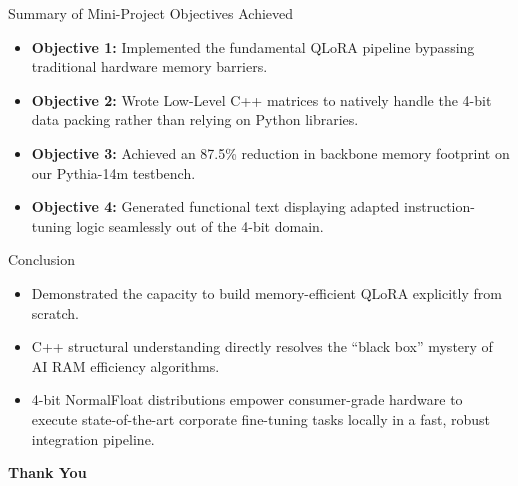 \documentclass[aspectratio=169]{beamer}
\begin{document}
\begin{frame}{Summary of Mini-Project Objectives Achieved}
    \begin{itemize}
        \item \textbf{Objective 1:} Implemented the fundamental QLoRA pipeline bypassing traditional hardware memory barriers.
        \item \textbf{Objective 2:} Wrote Low-Level C++ matrices to natively handle the 4-bit data packing rather than relying on Python libraries.
        \item \textbf{Objective 3:} Achieved an 87.5\% reduction in backbone memory footprint on our Pythia-14m testbench.
        \item \textbf{Objective 4:} Generated functional text displaying adapted instruction-tuning logic seamlessly out of the 4-bit domain.
    \end{itemize}
\end{frame}

\begin{frame}{Conclusion}
    \begin{itemize}
        \item Demonstrated the capacity to build memory-efficient QLoRA explicitly from scratch.
        \item C++ structural understanding directly resolves the ``black box'' mystery of AI RAM efficiency algorithms.
        \item 4-bit NormalFloat distributions empower consumer-grade hardware to execute state-of-the-art corporate fine-tuning tasks locally in a fast, robust integration pipeline.
    \end{itemize}
    \vspace{0.5cm}
    \centering
    \Large \textbf{Thank You}
\end{frame}
\end{document}
